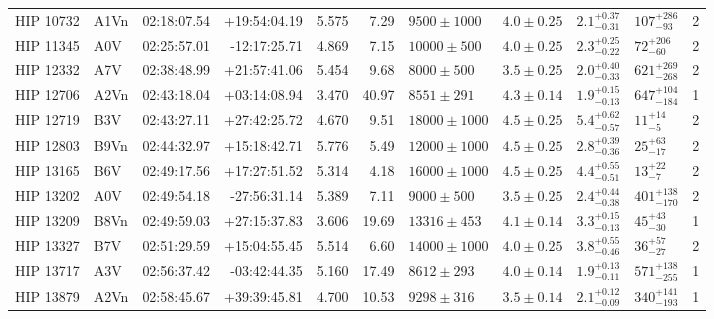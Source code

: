 \begin{landscape}
\begin{scriptsize}
\begin{longtable}{|l|lrrrrlllll|}
   HIP 10732 &     A1Vn &    02:18:07.54 &   +19:54:04.19 &   5.575 &      7.29 &   $9500 \pm 1000$ &  $4.0 \pm 0.25$ &  $2.1^{+0.37}_{-0.31}$ &    $107^{+286}_{-93}$ &       2 \\
   HIP 11345 &      A0V &    02:25:57.01 &   -12:17:25.71 &   4.869 &      7.15 &   $10000 \pm 500$ &  $4.0 \pm 0.25$ &  $2.3^{+0.25}_{-0.22}$ &     $72^{+206}_{-60}$ &       2 \\
   HIP 12332 &      A7V &    02:38:48.99 &   +21:57:41.06 &   5.454 &      9.68 &    $8000 \pm 500$ &  $3.5 \pm 0.25$ &  $2.0^{+0.40}_{-0.33}$ &   $621^{+269}_{-268}$ &       2 \\
   HIP 12706 &     A2Vn &    02:43:18.04 &   +03:14:08.94 &   3.470 &     40.97 &    $8551 \pm 291$ &  $4.3 \pm 0.14$ &  $1.9^{+0.15}_{-0.13}$ &   $647^{+104}_{-184}$ &       1 \\
   HIP 12719 &      B3V &    02:43:27.11 &   +27:42:25.72 &   4.670 &      9.51 &  $18000 \pm 1000$ &  $4.5 \pm 0.25$ &  $5.4^{+0.62}_{-0.57}$ &       $11^{+14}_{-5}$ &       2 \\
   HIP 12803 &     B9Vn &    02:44:32.97 &   +15:18:42.71 &   5.776 &      5.49 &  $12000 \pm 1000$ &  $4.5 \pm 0.25$ &  $2.8^{+0.39}_{-0.36}$ &      $25^{+63}_{-17}$ &       2 \\
   HIP 13165 &      B6V &    02:49:17.56 &   +17:27:51.52 &   5.314 &      4.18 &  $16000 \pm 1000$ &  $4.5 \pm 0.25$ &  $4.4^{+0.55}_{-0.51}$ &       $13^{+22}_{-7}$ &       2 \\
   HIP 13202 &      A0V &    02:49:54.18 &   -27:56:31.14 &   5.389 &      7.11 &    $9000 \pm 500$ &  $3.5 \pm 0.25$ &  $2.4^{+0.44}_{-0.38}$ &   $401^{+138}_{-170}$ &       2 \\
   HIP 13209 &     B8Vn &    02:49:59.03 &   +27:15:37.83 &   3.606 &     19.69 &   $13316 \pm 453$ &  $4.1 \pm 0.14$ &  $3.3^{+0.15}_{-0.13}$ &      $45^{+43}_{-30}$ &       1 \\
   HIP 13327 &      B7V &    02:51:29.59 &   +15:04:55.45 &   5.514 &      6.60 &  $14000 \pm 1000$ &  $4.0 \pm 0.25$ &  $3.8^{+0.55}_{-0.46}$ &      $36^{+57}_{-27}$ &       2 \\
   HIP 13717 &      A3V &    02:56:37.42 &   -03:42:44.35 &   5.160 &     17.49 &    $8612 \pm 293$ &  $4.0 \pm 0.14$ &  $1.9^{+0.13}_{-0.11}$ &   $571^{+138}_{-255}$ &       1 \\
   HIP 13879 &     A2Vn &    02:58:45.67 &   +39:39:45.81 &   4.700 &     10.53 &    $9298 \pm 316$ &  $3.5 \pm 0.14$ &  $2.1^{+0.12}_{-0.09}$ &   $340^{+141}_{-193}$ &       1 \\

\end{longtable}
\end{scriptsize}
\end{landscape}
